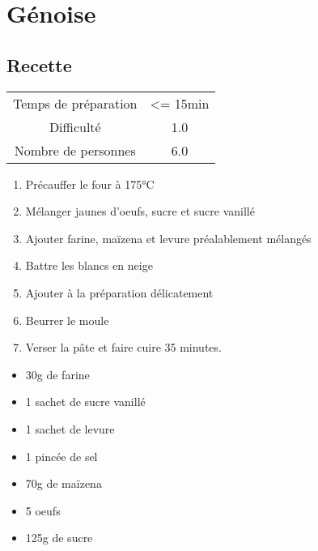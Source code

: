 \newpage
\section{Génoise}
    \label{sec:Génoise}
    \subsection{Recette}
    \vspace{1cm}


    \begin{center}
        \begin{tabular}{c|c}
            Temps de préparation & <= 15min \\
            Difficulté & 1.0 \\
            Nombre de personnes & 6.0 
        \end{tabular}
    \end{center}{}

    \vspace{1cm}
    \hline
    \vspace{1cm}

    \begin{minipage}{.7\textwidth}
        \begin{enumerate}
            \item Précauffer le four à 175°C
	    \item Mélanger jaunes d'oeufs, sucre et sucre vanillé
	    \item Ajouter farine, maïzena et levure préalablement mélangés
	    \item Battre les blancs en neige
	    \item Ajouter à la préparation délicatement
	    \item Beurrer le moule
	    \item Verser la pâte et faire cuire 35 minutes.

        \end{enumerate}
    \end{minipage}
    \begin{minipage}{.3\textwidth}
        \begin{flushleft}
        \begin{itemize}
            \item 30g de farine
	    \item 1 sachet de sucre vanillé
	    \item 1 sachet de levure
	    \item 1 pincée de sel
	    \item 70g de maïzena
	    \item 5 oeufs
	    \item 125g de sucre

        \end{itemize}
        \end{flushleft}
    \end{minipage}
    
